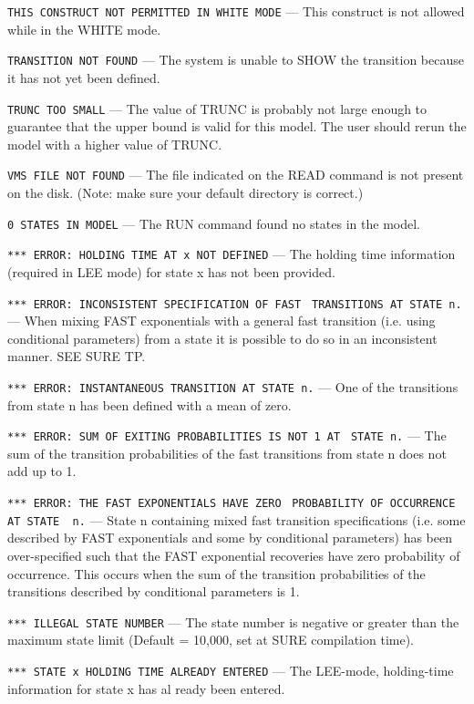 \noindent \verb|THIS CONSTRUCT NOT PERMITTED IN WHITE MODE| --- 
This construct is not allowed while in the WHITE mode.

\noindent \verb|TRANSITION NOT FOUND| --- 
The system is unable to SHOW the transition because it has not yet been defined.

\noindent \verb|TRUNC TOO SMALL| --- 
The value of TRUNC is probably not large enough to guarantee that the upper
bound is valid for this model.  The user should rerun the model with a higher
value of TRUNC.

\noindent \verb|VMS FILE NOT FOUND| --- 
The file indicated on the READ command is not present on the disk.  (Note:
make sure your default directory is correct.)

\noindent \verb|0 STATES IN MODEL| --- 
The RUN command found no states in the model.

\noindent \verb|*** ERROR: HOLDING TIME AT x NOT DEFINED| --- 
The holding time information (required in LEE mode) for state 
x has not been provided.

\noindent \verb|*** ERROR: INCONSISTENT SPECIFICATION OF FAST|
\verb| TRANSITIONS AT STATE n.| --- 
When mixing FAST exponentials with a general fast transition (i.e. using
conditional parameters) from a state it is possible to do so in an
inconsistent manner.  SEE SURE TP.

\noindent \verb|*** ERROR: INSTANTANEOUS TRANSITION AT STATE n.| --- 
One of the transitions from state n has been defined 
with a mean of zero.

\noindent \verb|*** ERROR: SUM OF EXITING PROBABILITIES IS NOT 1 AT|
\noindent \verb| STATE n.| --- 
The sum of the transition probabilities 
of the fast transitions from state n does not add up to 1.

\noindent \verb|*** ERROR: THE FAST EXPONENTIALS HAVE ZERO|~
\verb|PROBABILITY OF OCCURRENCE AT STATE  n.| --- 
State n containing mixed fast transition specifications (i.e. some described
by FAST exponentials and some by conditional parameters) has been
over-specified such that the FAST exponential recoveries have zero probability
of occurrence.  This occurs when the sum of the transition probabilities of
the transitions described by conditional parameters is 1.

\noindent \verb|*** ILLEGAL STATE NUMBER| --- 
The state number is negative or greater than the maximum state limit (Default = 
10,000, set at SURE compilation time).

\noindent \verb|*** STATE x HOLDING TIME ALREADY ENTERED| --- 
The LEE-mode, holding-time information for state x has al ready been entered.

